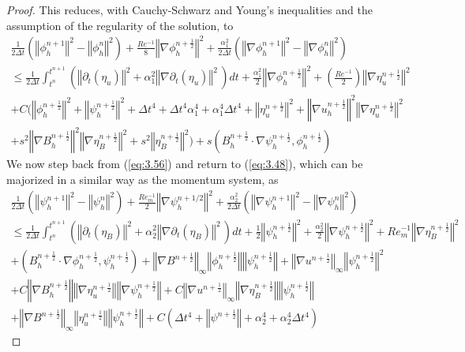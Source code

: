 \documentclass[11pt]{article}%
\numberwithin{equation}{section}
\newcommand{\norm}[1]{\left\Vert#1\right\Vert}
\def\grad{{\nabla}}
\def\nplushalf{{n+\frac12}}
\begin{document}
\begin{proof}
This reduces, with Cauchy-Schwarz and Young's inequalities and the assumption of the regularity of the solution, to
	\begin{multline}
	\frac{1}{2\Delta t}(\norm{\phi^{n+1}_{h}}^{2} - \norm{\phi^{n}_{h}}^{2})  + \frac{Re^{-1}}{8}\norm{\nabla \phi^{\nplushalf}_{h}}^{2}+\frac{\alpha_1^2}{2\Delta t}(\norm{\grad{\phi}^{n+1}_{h}}^{2} - \norm{\grad{\phi}^{n}_{h}}^{2}) \\
	\leq \frac{1}{2\Delta t}\int^{t^{n+1}}_{t^{n}} (\norm{\partial_{t}(\eta_{u})}^{2}+\alpha_1^2\norm{\grad{\partial_{t}(\eta_{u})}}^{2}\, )dt  +\frac{\alpha_1^2}{2}\norm{\grad{\phi_h^{\nplushalf}}}^2+ \left(\frac{Re^{-1}}{2}\right)\norm{\grad{\eta}^{\nplushalf}_{u}}^{2} \\
	+ C(\norm{\phi_h^{\nplushalf}}^2 + \norm{\psi_h^{\nplushalf}}^2 + \Delta t^4+\Delta t^4 \alpha_1^4 + \alpha_1^4\Delta t^4
	+ \norm{\eta_u^{\nplushalf}}^2 + \norm{\nabla u_h^{\nplushalf}}^2\norm{\nabla \eta_u^{\nplushalf}}^2\\
	+ s^2\norm{\nabla B_h^{\nplushalf}}^2\norm{\nabla \eta_B^{\nplushalf}}^2 
	+ s^2 \norm{\eta_B^{\nplushalf}}^2)	
	+ s(B_h^{\nplushalf}\cdot\nabla \psi_h^{\nplushalf},\phi_h^{\nplushalf})
	\label{eq:3.56}
	\end{multline}
	We now step back from (\ref{eq:3.56}) and return to (\ref{eq:3.48}), which can be majorized in a similar way as the momentum system, as
	\begin{multline}
	\frac{1}{2\Delta t}(\norm{\psi^{n+1}_{h}}^{2} - \norm{\psi^{n}_{h}}^{2}) + \frac{Re^{-1}_{m}}{2}\norm{\grad{\psi^{n+1/2}_{h}}}^{2}+\frac{\alpha_2^2}{2\Delta t}(\norm{\grad{\psi}^{n+1}_{h}}^{2} - \norm{\grad{\psi}^{n}_{h}}^{2})\\
	 	\leq \frac{1}{2\Delta t} \int^{t^{n+1}}_{t^{n}}  (\norm{\partial_{t}(\eta_{B})}^{2}+\alpha_2^2\norm{\grad{\partial_{t}(\eta_{B})}}^{2}\, )dt 
	 + \frac{1}{2}\norm{\psi^{\nplushalf}_{h}}^{2} + \frac{\alpha_2^2}{2}\norm{\grad{\psi}^{\nplushalf}_{h}}^{2}+ Re^{-1}_{m}\norm{\grad{\eta^{\nplushalf}_{B}}}^{2}\\
	 + (B^{\nplushalf}_{h} \cdot \grad{\phi^{\nplushalf}_{h}}, \psi^{\nplushalf}_{h})
	 + \norm{\nabla B^{\nplushalf}}_{\infty}\norm{\phi_h^{\nplushalf}}\norm{\psi_h^{\nplushalf}}
	 + \norm{\nabla u^{\nplushalf}}_{\infty}\norm{\psi_h^{\nplushalf}}^2\\
	  + C\norm{\nabla B_h^{\nplushalf}}\norm{\nabla \eta_u^{\nplushalf}}\norm{\nabla \psi_h^{\nplushalf}}
	 + C\norm{\nabla u^{\nplushalf}}_{\infty}\norm{\nabla \eta_B^{\nplushalf}}\norm{\psi_h^{\nplushalf}}\\
	 + \norm{\nabla B^{\nplushalf}}_{\infty}\norm{\eta_u^{\nplushalf}}\norm{\psi_h^{\nplushalf}}
	         +C\left(\Delta t^4 + \norm{\psi^{\nplushalf}} + \alpha_2^4 + \alpha_2^4 \Delta t^4\right)
	 \end{multline}
	

\end{proof}
\end{document}
